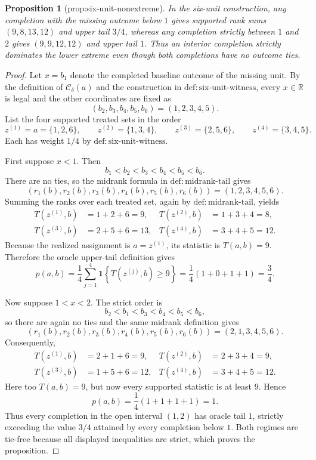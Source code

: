 \documentclass{article}
\newtheorem{proposition}{Proposition}
\begin{document}
\begin{proposition}[prop:six-unit-nonextreme]\label{prop:six-unit-nonextreme}
In the six-unit construction, any completion with the missing outcome below \(1\) gives supported rank sums \((9,8,13,12)\) and upper tail \(3/4\), whereas any completion strictly between \(1\) and \(2\) gives \((9,9,12,12)\) and upper tail \(1\). Thus an interior completion strictly dominates the lower extreme even though both completions have no outcome ties.
\end{proposition}
\begin{proof}
Let \(x=b_1\) denote the completed baseline outcome of the missing unit.  By the definition of \(\mathcal C_\delta(a)\) and the construction in \(\mathrm{def:six\mbox{-}unit\mbox{-}witness}\), every \(x\in\mathbb R\) is legal and the other coordinates are fixed as
\[
(b_2,b_3,b_4,b_5,b_6)=(1,2,3,4,5).
\]
List the four supported treated sets in the order
\[
z^{(1)}=a=\{1,2,6\},\qquad z^{(2)}=\{1,3,4\},\qquad z^{(3)}=\{2,5,6\},\qquad z^{(4)}=\{3,4,5\}.
\]
Each has weight \(1/4\) by \(\mathrm{def:six\mbox{-}unit\mbox{-}witness}\).

First suppose \(x<1\).  Then
\[
b_1<b_2<b_3<b_4<b_5<b_6.
\]
There are no ties, so the midrank formula in \(\mathrm{def:midrank\mbox{-}tail}\) gives
\[
(r_1(b),r_2(b),r_3(b),r_4(b),r_5(b),r_6(b))=(1,2,3,4,5,6).
\]
Summing the ranks over each treated set, again by \(\mathrm{def:midrank\mbox{-}tail}\), yields
\[
\begin{aligned}
T(z^{(1)},b)&=1+2+6=9, &
T(z^{(2)},b)&=1+3+4=8,\\
T(z^{(3)},b)&=2+5+6=13, &
T(z^{(4)},b)&=3+4+5=12.
\end{aligned}
\]
Because the realized assignment is \(a=z^{(1)}\), its statistic is \(T(a,b)=9\).  Therefore the oracle upper-tail definition gives
\[
p(a,b)=\frac14\sum_{j=1}^4\mathbf 1\!\left\{T(z^{(j)},b)\ge 9\right\}
=\frac14(1+0+1+1)=\frac34.
\]

Now suppose \(1<x<2\).  The strict order is
\[
b_2<b_1<b_3<b_4<b_5<b_6,
\]
so there are again no ties and the same midrank definition gives
\[
(r_1(b),r_2(b),r_3(b),r_4(b),r_5(b),r_6(b))=(2,1,3,4,5,6).
\]
Consequently,
\[
\begin{aligned}
T(z^{(1)},b)&=2+1+6=9, &
T(z^{(2)},b)&=2+3+4=9,\\
T(z^{(3)},b)&=1+5+6=12, &
T(z^{(4)},b)&=3+4+5=12.
\end{aligned}
\]
Here too \(T(a,b)=9\), but now every supported statistic is at least \(9\).  Hence
\[
p(a,b)=\frac14(1+1+1+1)=1.
\]
Thus every completion in the open interval \((1,2)\) has oracle tail \(1\), strictly exceeding the value \(3/4\) attained by every completion below \(1\).  Both regimes are tie-free because all displayed inequalities are strict, which proves the proposition.
\end{proof}
\end{document}
